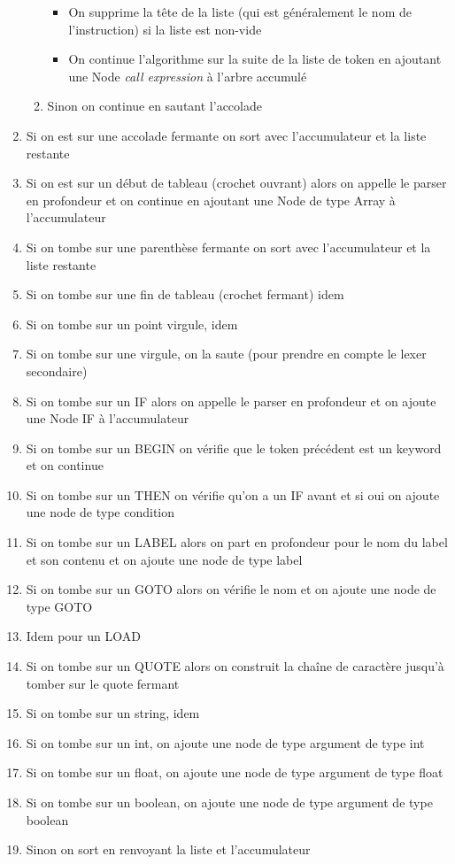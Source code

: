 \documentclass{beamer}
\begin{document}
\begin{frame}[allowframebreaks]
\begin{enumerate}
\begin{enumerate}
\begin{itemize}
                    \item On supprime la tête de la liste (qui est généralement le nom de l'instruction) si la liste est non-vide 
                    \item On continue l'algorithme sur la suite de la liste de token en ajoutant une Node \textit{call expression} à l'arbre accumulé 
                \end{itemize}
                \item Sinon on continue en sautant l'accolade
            \end{enumerate}
            \item Si on est sur une accolade fermante on sort avec l'accumulateur et la liste restante
            \item Si on est sur un début de tableau (crochet ouvrant) alors on appelle le parser en profondeur et on continue 
            en ajoutant une Node de type Array à l'accumulateur
            \item Si on tombe sur une parenthèse fermante on sort avec l'accumulateur et la liste restante
            \item Si on tombe sur une fin de tableau (crochet fermant) idem
            \item Si on tombe sur un point virgule, idem
            \item Si on tombe sur une virgule, on la saute (pour prendre en compte le lexer secondaire)
            \item Si on tombe sur un IF alors on appelle le parser en profondeur et on ajoute une Node IF à l'accumulateur
            \item Si on tombe sur un BEGIN on vérifie que le token précédent est un keyword et on continue
            \item Si on tombe sur un THEN on vérifie qu'on a un IF avant et si oui on ajoute une node de type condition
            \item Si on tombe sur un LABEL alors on part en profondeur pour le nom du label et son contenu et on ajoute une node de type label
            \item Si on tombe sur un GOTO alors on vérifie le nom et on ajoute une node de type GOTO
            \item Idem pour un LOAD
            \item Si on tombe sur un QUOTE alors on construit la chaîne de caractère jusqu'à tomber sur le quote fermant
            \item Si on tombe sur un string, idem
            \item Si on tombe sur un int, on ajoute une node de type argument de type int
            \item Si on tombe sur un float, on ajoute une node de type argument de type float
            \item Si on tombe sur un boolean, on ajoute une node de type argument de type boolean
            \item Sinon on sort en renvoyant la liste et l'accumulateur
        \end{enumerate}
    \end{frame}
\end{document}
